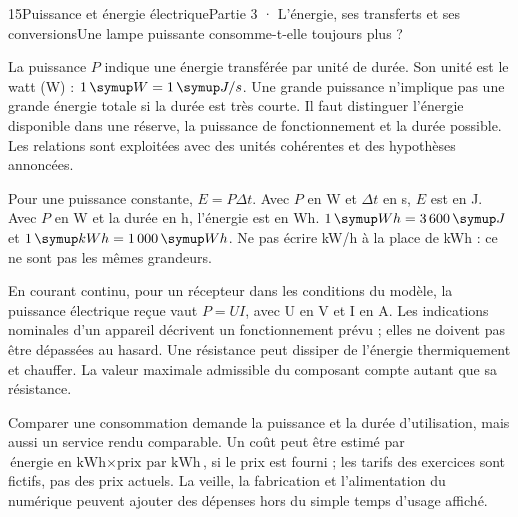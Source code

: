 \begin{ouverture}[college3]{15}{Puissance et énergie électrique}{Partie 3 · L’énergie, ses transferts et ses conversions}{Une lampe puissante consomme-t-elle toujours plus ?}
\end{ouverture}
\label{ess-15}
La puissance $P$ indique une énergie transférée par unité de durée. Son unité est le watt (W) : $1\unite W=1\unite{J/s}$. Une grande puissance n’implique pas une grande énergie totale si la durée est très courte. Il faut distinguer l’énergie disponible dans une réserve, la puissance de fonctionnement et la durée possible. Les relations sont exploitées avec des unités cohérentes et des hypothèses annoncées.\par
{}
Pour une puissance constante, $E=P\Delta t$. Avec $P$ en W et $\Delta t$ en s, $E$ est en J. Avec $P$ en W et la durée en h, l’énergie est en Wh. $1\unite{Wh}=3\,600\unite J$ et $1\unite{kWh}=1\,000\unite{Wh}$. Ne pas écrire kW/h à la place de kWh : ce ne sont pas les mêmes grandeurs.\par
\clearpage
{}
En courant continu, pour un récepteur dans les conditions du modèle, la puissance électrique reçue vaut $P=UI$, avec U en V et I en A. Les indications nominales d’un appareil décrivent un fonctionnement prévu ; elles ne doivent pas être dépassées au hasard. Une résistance peut dissiper de l’énergie thermiquement et chauffer. La valeur maximale admissible du composant compte autant que sa résistance.\par
{}
Comparer une consommation demande la puissance et la durée d’utilisation, mais aussi un service rendu comparable. Un coût peut être estimé par $\text{énergie en kWh}\times\text{prix par kWh}$, si le prix est fourni ; les tarifs des exercices sont fictifs, pas des prix actuels. La veille, la fabrication et l’alimentation du numérique peuvent ajouter des dépenses hors du simple temps d’usage affiché.\par
